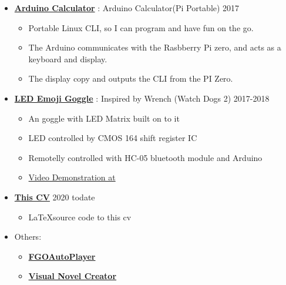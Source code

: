 \begin{itemize}
    \item \href{https://github.com/RustColeone/PiPortable}{\color{link}\textbf{Arduino Calculator}} : Arduino Calculator(Pi Portable)\dashdiv{} 2017

    \begin{itemize}
      \item Portable Linux CLI, so I can program and have fun on the go.
      \item The Arduino communicates with the Rasbberry Pi zero, and acts as a keyboard and display.
      \item The display copy and outputs the CLI from the PI Zero.
    \end{itemize}

    \item \href{https://github.com/RustColeone/LEDEmojiGoggle}{\color{link}\textbf{LED Emoji Goggle}} : Inspired by Wrench (Watch Dogs 2)\dashdiv{} 2017-2018

    \begin{itemize}
      \item An goggle with LED Matrix built on to it
      \item LED controlled by CMOS 164 shift register IC
      \item Remotelly controlled with HC-05 bluetooth module and Arduino
      \item \href{https://www.bilibili.com/video/av33283411/}{\color{link}Video Demonstration at \bilibiliicon{}}
    \end{itemize}

    \item \href{https://github.com/RustColeone/cv}{\color{link}\textbf{This CV}} \dashdiv{} 2020 todate
    \begin{itemize}
      \item \LaTeX \space source code to this cv
    \end{itemize}

    \item Others:
    \begin{itemize}
      \item \href{https://github.com/RustColeone/FGOAutoPlayer}{\color{link}\textbf{FGOAutoPlayer}} 
      \item \href{https://github.com/RustColeone/VisualNovelCreator}{\color{link}\textbf{Visual Novel Creator}} 
    \end{itemize}

  \end{itemize}

